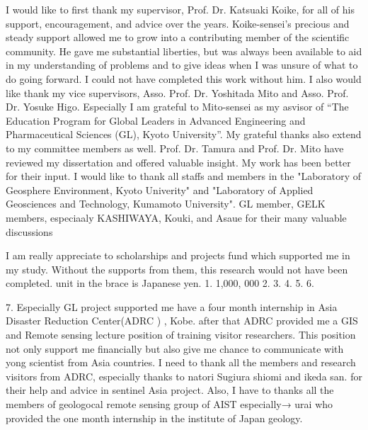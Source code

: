 \begin{acknowledgements}
I would like to first thank my supervisor, Prof. Dr. Katsuaki Koike, for all of his support, encouragement, and advice over the years. Koike-sensei's precious and steady support allowed me to grow into a contributing member of the scientific community.
He gave me substantial liberties, but was always been available to aid in my understanding of problems and to give ideas when I was unsure of what to do going forward. I could not have completed this work without him.
I also would like thank my vice supervisors, Asso. Prof. Dr. Yoshitada Mito and Asso. Prof. Dr. Yosuke Higo. Especially I am grateful to Mito-sensei as my asvisor of “The Education Program for Global Leaders in Advanced Engineering and Pharmaceutical Sciences (GL), Kyoto University”.
My grateful thanks also extend to my committee members as well.  Prof. Dr. Tamura  and Prof. Dr. Mito have reviewed my dissertation and offered valuable insight. My work has been better for their input.
I would like to thank all staffs and members in the "Laboratory of Geosphere Environment, Kyoto Univerity" and  "Laboratory of Applied Geosciences and Technology, Kumamoto University". GL member, GELK members, especiaaly KASHIWAYA, Kouki, and Asaue for their many valuable discussions

I am really appreciate to scholarships and projects fund which supported me in my study.  Without the supports  from them, this research would not have been completed.  unit in the brace is Japanese yen. 
1. 1,000, 000
2.  
3.
4.
5.
6.

7.
Especially GL project supported me have  a
four month internship in Asia Disaster Reduction Center(ADRC ) , Kobe. 
after that ADRC provided me a GIS and Remote sensing lecture position of training visitor researchers. This position not only support me financially but also give me chance to communicate with yong scientist from Asia countries. I need to  thank all the members and research visitors from ADRC, especially thanks to natori Sugiura  shiomi  and ikeda san. for their help and advice in sentinel Asia project. 
Also, I  have to thanks all  the members of  geologocal  remote sensing group  of AIST especially→ urai  who provided the one month internship in the institute of Japan geology. 






\end{acknowledgements}
